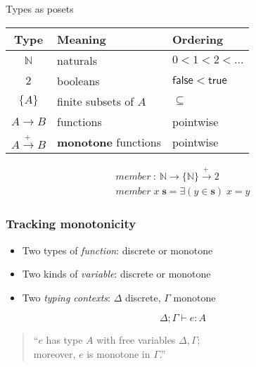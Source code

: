 \documentclass{beamer}
\newcommand{\mto}{\overset{\textbf{+}\:}{\to}}
\newcommand{\ms}{\mathsf}
\begin{document}
\begin{frame}{Types as posets}\Large

  \begin{center}
    \begin{tabular}{cll}
      \textbf{Type} & \textbf{Meaning} & \textbf{Ordering}
      \\\hline
      $\mathbb{N}$ & naturals & $0 < 1 < 2 < \hdots$\\
      $2$ & booleans & $\ms{false} < \ms{true}$\\
      $\{A\}$      & finite subsets of $A$ & ${\subseteq}$\\
      $A \to B$    & functions & pointwise\\
      $A \mto B$  & \textbf{monotone} functions & pointwise
    \end{tabular}
  \end{center}

  \vspace{0.75em}\pause

  \[\begin{array}{l}
    member ~:~ \mathbb{N} \to \{\mathbb{N}\} \mto 2\\
    member\; x\; \mathbf{s} = \exists(y \in \mathbf{s})\; x = y
  \end{array}\]
\end{frame}


\begin{frame}
  \frametitle{Tracking monotonicity}

  \Large
  \begin{itemize}
  \item Two types of \emph{function}: discrete or monotone
  \item Two kinds of \emph{variable}: discrete or monotone
  \item Two \emph{typing contexts}: $\Delta$ discrete, $\Gamma$ monotone
  \end{itemize}

  {\huge\[\Delta;\Gamma \vdash e : A\]}

  \begin{quote}
    \hspace{-1.1ex}``$e$ has type $A$ with free variables $\Delta,\Gamma$;\\
    moreover, $e$ is monotone in $\Gamma$.''
  \end{quote}
\end{frame}
\end{document}
